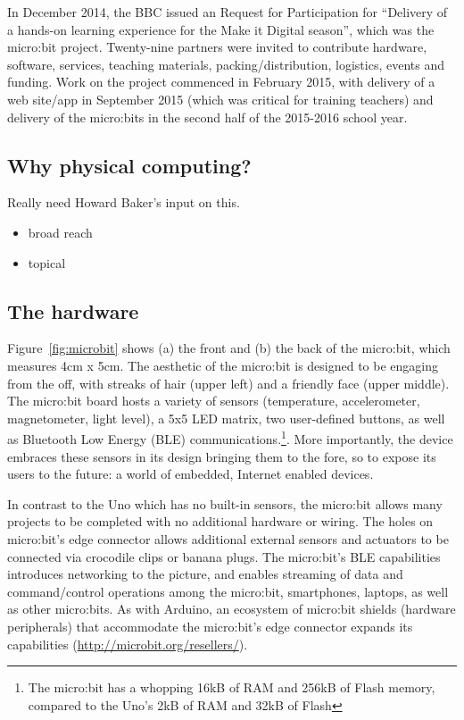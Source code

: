 In December 2014, the BBC issued an Request for Participation
for ``Delivery of a hands-on learning experience for the Make it Digital season'',
which was the micro:bit project.
Twenty-nine partners were invited to contribute hardware, software, services,
teaching materials, packing/distribution, logistics, events and funding.
Work on the project commenced in February 2015, with delivery of
a web site/app in September 2015 (which was critical
for training teachers) and delivery of the micro:bits in the second
half of the 2015-2016 school year.

\subsection{Why physical computing?}

Really need Howard Baker's input on this.

\begin{itemize}
    \item broad reach
    \item topical
\end{itemize}

\subsection{The hardware}

Figure~\ref{fig:microbit} shows (a) the front and (b) the back of the
micro:bit, which measures 4cm x 5cm. The aesthetic of the micro:bit is designed to be engaging from the off, with streaks of hair (upper left) and a friendly face (upper middle).
The micro:bit board hosts a variety of sensors (temperature, accelerometer, magnetometer,
light level), a 5x5 LED matrix, two user-defined buttons, as well as Bluetooth
Low Energy (BLE) communications.\footnote{The micro:bit has a whopping
16kB of RAM and 256kB of Flash memory, compared to the Uno's 2kB of
RAM and 32kB of Flash}. More importantly, the device embraces these sensors in its design bringing them to the fore, so to expose its users to the future: a world of embedded, Internet enabled devices.

In contrast to the Uno which has no built-in sensors, the micro:bit
allows many projects to be completed with no additional hardware or wiring.
The holes on micro:bit's edge connector allows additional external sensors and actuators to be connected via crocodile clips or banana plugs.
The micro:bit's BLE capabilities introduces networking to the
picture, and enables streaming of data and command/control operations among the micro:bit,
smartphones, laptops, as well as other micro:bits.
As with Arduino, an ecosystem of micro:bit shields
(hardware peripherals) that accommodate the micro:bit's edge
connector expands its capabilities (\url{http://microbit.org/resellers/}).

